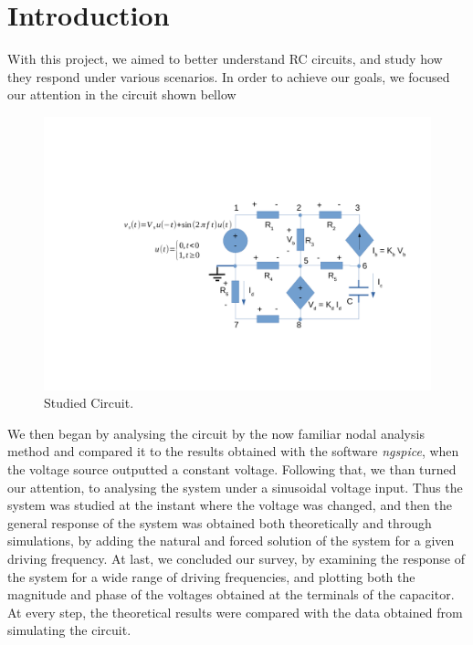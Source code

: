 \section{Introduction}
\label{sec:introduction}

With this project, we aimed to better understand RC circuits, and study how they respond under various scenarios. In order to achieve our goals, we focused our attention in the circuit shown bellow

\begin{figure}[h] \centering
\includegraphics[width=0.4\linewidth]{Circuito.pdf}
\caption{Studied Circuit.}
\label{fig:rc}
\end{figure}

We then began by analysing the circuit by the now familiar nodal analysis method and compared it to the results obtained with the software \textit{ngspice}, when the voltage source outputted a constant voltage. Following that, we than turned our attention, to analysing the system under a sinusoidal voltage input. Thus the system was studied at the instant where the voltage was changed, and then the general response of the system was obtained both theoretically and through simulations, by adding the natural and forced solution of the system for a given driving frequency. At last, we concluded our survey, by examining the response of the system for a wide range of driving frequencies, and plotting both the magnitude and phase of the voltages obtained at the terminals of the capacitor. At every step, the theoretical results were compared with the data obtained from simulating the circuit.  

